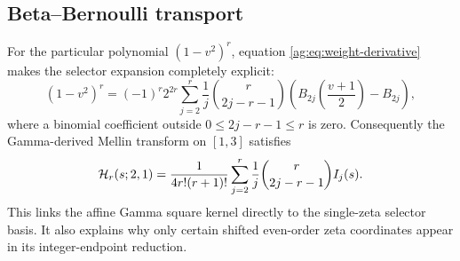 \subsection{Beta--Bernoulli transport}
For the particular polynomial $(1-v^2)^r$, equation
\eqref{ag:eq:weight-derivative} makes the selector expansion completely
explicit:
\begin{equation}\label{ag:eq:beta-Bernoulli}
 (1-v^2)^r=(-1)^r2^{2r}\sum_{j=2}^{r}
       \frac1j\binom r{2j-r-1}
       \left(B_{2j}\left(\frac{v+1}{2}\right)-B_{2j}\right),
\end{equation}
where a binomial coefficient outside $0\le2j-r-1\le r$ is zero.
Consequently the Gamma-derived Mellin transform on $[1,3]$ satisfies
\begin{equation}\label{ag:eq:H-selector-transport}
 \mathcal H_r(s;2,1)=\frac1{4r!(r+1)!}
                 \sum_{j=2}^{r}\frac1j\binom r{2j-r-1}I_j(s).
\end{equation}
This links the affine Gamma square kernel directly to the single-zeta
selector basis. It also explains why only certain shifted even-order
zeta coordinates appear in its integer-endpoint reduction.

